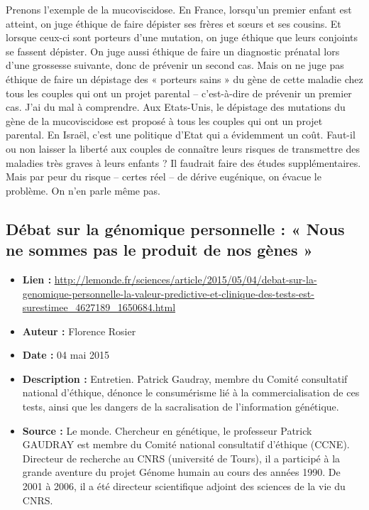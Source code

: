 \documentclass[8pt]{article}
\begin{document}
Prenons l’exemple de la mucoviscidose. En France, lorsqu’un premier enfant est atteint, on juge éthique de faire dépister ses frères et sœurs et ses cousins. Et lorsque ceux-ci sont porteurs d’une mutation, on juge éthique que leurs conjoints se fassent dépister. On juge aussi éthique de faire un diagnostic prénatal lors d’une grossesse suivante, donc de prévenir un second cas. Mais on ne juge pas éthique de faire un dépistage des « porteurs sains » du gène de cette maladie chez tous les couples qui ont un projet parental – c’est-à-dire de prévenir un premier cas. J’ai du mal à comprendre. Aux Etats-Unis, le dépistage des mutations du gène de la mucoviscidose est proposé à tous les couples qui ont un projet parental. En Israël, c’est une politique d’Etat qui a évidemment un coût. Faut-il ou non laisser la liberté aux couples de connaître leurs risques de transmettre des maladies très graves à leurs enfants ? Il faudrait faire des études supplémentaires. Mais par peur du risque – certes réel – de dérive eugénique, on évacue le problème. On n’en parle même pas.

\subsection{Débat sur la génomique personnelle : « Nous ne sommes pas le produit de nos gènes »}

\begin{itemize}
	\item \textbf{Lien : }  \url{ http://lemonde.fr/sciences/article/2015/05/04/debat-sur-la-genomique-personnelle-la-valeur-predictive-et-clinique-des-tests-est-surestimee_4627189_1650684.html} 
	\item \textbf{Auteur : } Florence Rosier
	\item \textbf{Date : } 04 mai 2015
	\item \textbf{Description : } Entretien. Patrick Gaudray, membre du Comité consultatif national d’éthique, dénonce le consumérisme lié à la commercialisation de ces tests, ainsi que les dangers de la sacralisation de l’information génétique.
	\item \textbf{Source : } Le monde. Chercheur en génétique, le professeur Patrick GAUDRAY est membre du Comité national consultatif d’éthique (CCNE). Directeur de recherche au CNRS (université de Tours), il a participé à la grande aventure du projet Génome humain au cours des années 1990. De 2001 à 2006, il a été directeur scientifique adjoint des sciences de la vie du CNRS. 
\end{itemize}
\end{document}
